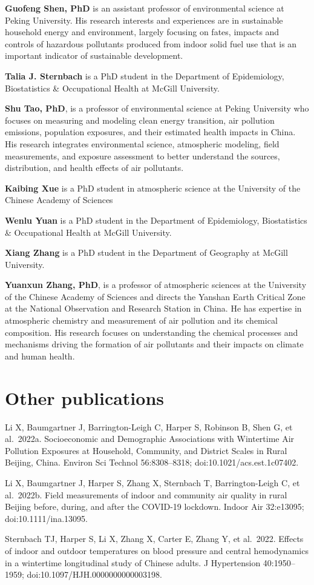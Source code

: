 \documentclass[
  letterpaper,
  DIV=11,
  numbers=noendperiod]{scrartcl}
\begin{document}
\textbf{Guofeng Shen, PhD} is an assistant professor of environmental
science at Peking University. His research interests and experiences are
in sustainable household energy and environment, largely focusing on
fates, impacts and controls of hazardous pollutants produced from indoor
solid fuel use that is an important indicator of sustainable
development.

\textbf{Talia J. Sternbach} is a PhD student in the Department of
Epidemiology, Biostatistics \& Occupational Health at McGill University.

\textbf{Shu Tao, PhD}, is a professor of environmental science at Peking
University who focuses on measuring and modeling clean energy
transition, air pollution emissions, population exposures, and their
estimated health impacts in China. His research integrates environmental
science, atmospheric modeling, field measurements, and exposure
assessment to better understand the sources, distribution, and health
effects of air pollutants.

\textbf{Kaibing Xue} is a PhD student in atmospheric science at the
University of the Chinese Academy of Sciences

\textbf{Wenlu Yuan} is a PhD student in the Department of Epidemiology,
Biostatistics \& Occupational Health at McGill University.

\textbf{Xiang Zhang} is a PhD student in the Department of Geography at
McGill University.

\textbf{Yuanxun Zhang, PhD}, is a professor of atmospheric sciences at
the University of the Chinese Academy of Sciences and directs the
Yanshan Earth Critical Zone at the National Observation and Research
Station in China. He has expertise in atmospheric chemistry and
measurement of air pollution and its chemical composition. His research
focuses on understanding the chemical processes and mechanisms driving
the formation of air pollutants and their impacts on climate and human
health.

\section*{Other publications}\label{other-publications}

Li X, Baumgartner J, Barrington-Leigh C, Harper S, Robinson B, Shen G,
et al.~2022a. Socioeconomic and Demographic Associations with Wintertime
Air Pollution Exposures at Household, Community, and District Scales in
Rural Beijing, China. Environ Sci Technol 56:8308--8318;
doi:10.1021/acs.est.1c07402.

Li X, Baumgartner J, Harper S, Zhang X, Sternbach T, Barrington-Leigh C,
et al.~2022b. Field measurements of indoor and community air quality in
rural Beijing before, during, and after the COVID-19 lockdown. Indoor
Air 32:e13095; doi:10.1111/ina.13095.

Sternbach TJ, Harper S, Li X, Zhang X, Carter E, Zhang Y, et al.~2022.
Effects of indoor and outdoor temperatures on blood pressure and central
hemodynamics in a wintertime longitudinal study of Chinese adults. J
Hypertension 40:1950--1959; doi:10.1097/HJH.0000000000003198.
\end{document}
